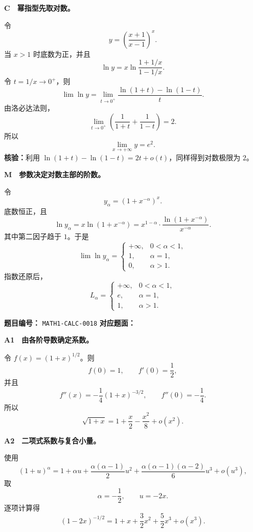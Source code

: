 \begin{solutionBox}
\textbf{C　幂指型先取对数。}

令
\[
y=\left(\frac{x+1}{x-1}\right)^x.
\]
当 \(x>1\) 时底数为正，并且
\[
\ln y
=x\ln\frac{1+1/x}{1-1/x}.
\]
令 \(t=1/x\to0^+\)，则
\[
\lim\ln y
=\lim_{t\to0^+}\frac{\ln(1+t)-\ln(1-t)}{t}.
\]
由洛必达法则，
\[
\lim_{t\to0^+}
\left(\frac1{1+t}+\frac1{1-t}\right)=2.
\]
所以
\[
\boxed{\lim_{x\to+\infty}y=e^2}.
\]
\textbf{核验：}利用
\(\ln(1+t)-\ln(1-t)=2t+o(t)\)，同样得到对数极限为 \(2\)。
\end{solutionBox}

\begin{solutionBox}
\textbf{M　参数决定对数主部的阶数。}

令
\[
y_\alpha=\left(1+x^{-\alpha}\right)^x.
\]
底数恒正，且
\[
\ln y_\alpha
=x\ln\left(1+x^{-\alpha}\right)
=x^{1-\alpha}
\cdot\frac{\ln(1+x^{-\alpha})}{x^{-\alpha}}.
\]
其中第二因子趋于 \(1\)。于是
\[
\lim\ln y_\alpha=
\begin{cases}
+\infty,&0<\alpha<1,\\
1,&\alpha=1,\\
0,&\alpha>1.
\end{cases}
\]
指数还原后，
\[
\boxed{
L_\alpha=
\begin{cases}
+\infty,&0<\alpha<1,\\
e,&\alpha=1,\\
1,&\alpha>1.
\end{cases}}
\]
\end{solutionBox}

\begin{problemMeta}
\textbf{题目编号：} \texttt{MATH1-CALC-0018}\quad
\textbf{对应题面：} 
\end{problemMeta}

\begin{solutionBox}
\textbf{A1　由各阶导数确定系数。}

令 \(f(x)=(1+x)^{1/2}\)。则
\[
f(0)=1,\qquad
f'(0)=\frac12,
\]
并且
\[
f''(x)=-\frac14(1+x)^{-3/2},
\qquad f''(0)=-\frac14.
\]
所以
\[
\boxed{
\sqrt{1+x}
=1+\frac{x}{2}-\frac{x^2}{8}+o(x^2)
}.
\]
\end{solutionBox}

\begin{solutionBox}
\textbf{A2　二项式系数与复合小量。}

使用
\[
(1+u)^\alpha
=1+\alpha u
+\frac{\alpha(\alpha-1)}{2}u^2
+\frac{\alpha(\alpha-1)(\alpha-2)}{6}u^3
+o(u^3),
\]
取
\[
\alpha=-\frac12,\qquad u=-2x.
\]
逐项计算得
\[
\boxed{
(1-2x)^{-1/2}
=1+x+\frac32x^2+\frac52x^3+o(x^3)
}.
\]
\end{solutionBox}


